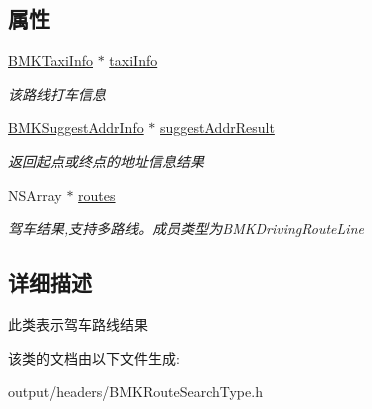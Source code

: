 \subsection*{属性}
\begin{DoxyCompactItemize}
\item 
\hypertarget{interface_b_m_k_driving_route_result_a4dc537f67ed47de78ac3bcda172397dd}{}\hyperlink{interface_b_m_k_taxi_info}{B\+M\+K\+Taxi\+Info} $\ast$ \hyperlink{interface_b_m_k_driving_route_result_a4dc537f67ed47de78ac3bcda172397dd}{taxi\+Info}\label{interface_b_m_k_driving_route_result_a4dc537f67ed47de78ac3bcda172397dd}

\begin{DoxyCompactList}\small\item\em 该路线打车信息 \end{DoxyCompactList}\item 
\hypertarget{interface_b_m_k_driving_route_result_adf554437aec4884ae9fdc7cdb8fc2625}{}\hyperlink{interface_b_m_k_suggest_addr_info}{B\+M\+K\+Suggest\+Addr\+Info} $\ast$ \hyperlink{interface_b_m_k_driving_route_result_adf554437aec4884ae9fdc7cdb8fc2625}{suggest\+Addr\+Result}\label{interface_b_m_k_driving_route_result_adf554437aec4884ae9fdc7cdb8fc2625}

\begin{DoxyCompactList}\small\item\em 返回起点或终点的地址信息结果 \end{DoxyCompactList}\item 
\hypertarget{interface_b_m_k_driving_route_result_a448147e99f71f6bf82c93a51dd2d4b81}{}N\+S\+Array $\ast$ \hyperlink{interface_b_m_k_driving_route_result_a448147e99f71f6bf82c93a51dd2d4b81}{routes}\label{interface_b_m_k_driving_route_result_a448147e99f71f6bf82c93a51dd2d4b81}

\begin{DoxyCompactList}\small\item\em 驾车结果,支持多路线。成员类型为\+B\+M\+K\+Driving\+Route\+Line \end{DoxyCompactList}\end{DoxyCompactItemize}


\subsection{详细描述}
此类表示驾车路线结果 

该类的文档由以下文件生成\+:\begin{DoxyCompactItemize}
\item 
output/headers/B\+M\+K\+Route\+Search\+Type.\+h\end{DoxyCompactItemize}
